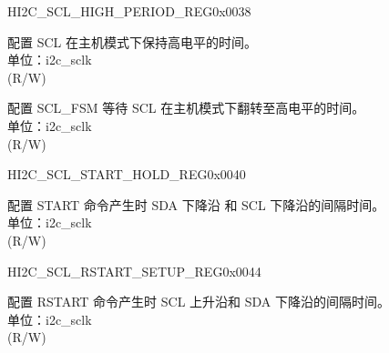 \begin{register}{H}{I2C\_SCL\_HIGH\_PERIOD\_REG}{0x0038}\label{regdesc:I2CSCLHIGHPERIODREG}
%
%
%
\regnewline%
\begin{regdesc}\begin{reglist}
\label{fielddesc:I2CSCLHIGHPERIOD}\item [I2C\_SCL\_HIGH\_PERIOD] 配置 SCL 在主机模式下保持高电平的时间。\\
单位：i2c\_sclk \\ (R/W)
\label{fielddesc:I2CSCLWAITHIGHPERIOD}\item [I2C\_SCL\_WAIT\_HIGH\_PERIOD] 配置 SCL\_FSM 等待 SCL 在主机模式下翻转至高电平的时间。\\
单位：i2c\_sclk \\ (R/W)
\end{reglist}\end{regdesc}
\end{register}


\begin{register}{H}{I2C\_SCL\_START\_HOLD\_REG}{0x0040}\label{regdesc:I2CSCLSTARTHOLDREG}
%
%
\regnewline%
\begin{regdesc}\begin{reglist}
\label{fielddesc:I2CSCLSTARTHOLDTIME}\item [I2C\_SCL\_START\_HOLD\_TIME] 配置 START 命令产生时 SDA 下降沿 和 SCL 下降沿的间隔时间。\\
单位：i2c\_sclk \\ (R/W)
\end{reglist}\end{regdesc}
\end{register}


\begin{register}{H}{I2C\_SCL\_RSTART\_SETUP\_REG}{0x0044}\label{regdesc:I2CSCLRSTARTSETUPREG}
%
%
\regnewline%
\begin{regdesc}\begin{reglist}
\label{fielddesc:I2CSCLRSTARTSETUPTIME}\item [I2C\_SCL\_RSTART\_SETUP\_TIME] 配置 RSTART 命令产生时 SCL 上升沿和 SDA 下降沿的间隔时间。\\
单位：i2c\_sclk \\ (R/W)
\end{reglist}\end{regdesc}
\end{register}


